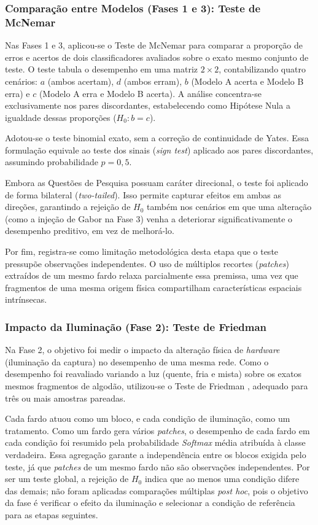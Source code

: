     \subsubsection{Comparação entre Modelos (Fases 1 e 3): Teste de McNemar}

        Nas Fases 1 e 3, aplicou-se o Teste de McNemar \cite{dietterich1998approximate} para comparar a proporção de erros e acertos de dois classificadores avaliados sobre o exato mesmo conjunto de teste. O teste tabula o desempenho em uma matriz $2 \times 2$, contabilizando quatro cenários: $a$ (ambos acertam), $d$ (ambos erram), $b$ (Modelo A acerta e Modelo B erra) e $c$ (Modelo A erra e Modelo B acerta). A análise concentra-se exclusivamente nos pares discordantes, estabelecendo como Hipótese Nula a igualdade dessas proporções ($H_{0}: b = c$).

        Adotou-se o teste binomial exato, sem a correção de continuidade de Yates. Essa formulação equivale ao teste dos sinais (\textit{sign test}) aplicado aos pares discordantes, assumindo probabilidade $p = 0,5$. 
        
        Embora as Questões de Pesquisa possuam caráter direcional, o teste foi aplicado de forma bilateral (\textit{two-tailed}). Isso permite capturar efeitos em ambas as direções, garantindo a rejeição de $H_{0}$ também nos cenários em que uma alteração (como a injeção de Gabor na Fase 3) venha a deteriorar significativamente o desempenho preditivo, em vez de melhorá-lo.

        Por fim, registra-se como limitação metodológica desta etapa que o teste pressupõe observações independentes. O uso de múltiplos recortes (\textit{patches}) extraídos de um mesmo fardo relaxa parcialmente essa premissa, uma vez que fragmentos de uma mesma origem física compartilham características espaciais intrínsecas.


    \subsubsection{Impacto da Iluminação (Fase 2): Teste de Friedman}

        Na Fase 2, o objetivo foi medir o impacto da alteração física de \textit{hardware} (iluminação da captura) no desempenho de uma mesma rede. Como o desempenho foi reavaliado variando a luz (quente, fria e mista) sobre os exatos mesmos fragmentos de algodão, utilizou-se o Teste de Friedman \cite{friedman1937use}, adequado para três ou mais amostras pareadas.

        Cada fardo atuou como um bloco, e cada condição de iluminação, como um tratamento. Como um fardo gera vários \textit{patches}, o desempenho de cada fardo em cada condição foi resumido pela probabilidade \textit{Softmax} média atribuída à classe verdadeira. Essa agregação garante a independência entre os blocos exigida pelo teste, já que \textit{patches} de um mesmo fardo não são observações independentes. Por ser um teste global, a rejeição de $H_{0}$ indica que ao menos uma condição difere das demais; não foram aplicadas comparações múltiplas \textit{post hoc}, pois o objetivo da fase é verificar o efeito da iluminação e selecionar a condição de referência para as etapas seguintes.